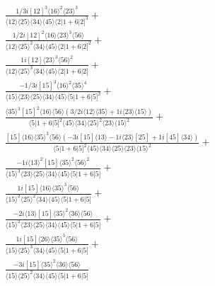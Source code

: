 \documentclass[varwidth, border=5pt]{standalone}
\begin{document}
\begin{my}
$\begin{gathered}
\scriptscriptstyle\frac{1/3i[12]^3⟨16⟩^2⟨23⟩^3}{⟨12⟩⟨25⟩⟨34⟩⟨45⟩⟨2|1+6|2]^3}+\\
\scriptscriptstyle\frac{1/2i[12]^2⟨16⟩⟨23⟩^3⟨56⟩}{⟨12⟩⟨25⟩^2⟨34⟩⟨45⟩⟨2|1+6|2]^2}+\\
\scriptscriptstyle\frac{1i[12]⟨23⟩^3⟨56⟩^2}{⟨12⟩⟨25⟩^3⟨34⟩⟨45⟩⟨2|1+6|2]}+\\
\scriptscriptstyle\frac{-1/3i[15]^3⟨16⟩^2⟨35⟩^4}{⟨15⟩⟨23⟩⟨25⟩⟨34⟩⟨45⟩⟨5|1+6|5]^3}+\\
\scriptscriptstyle\frac{⟨35⟩^3[15]^2⟨16⟩⟨56⟩(3/2i⟨12⟩⟨35⟩+1i⟨23⟩⟨15⟩)}{⟨5|1+6|5]^2⟨45⟩⟨34⟩⟨25⟩^2⟨23⟩⟨15⟩^2}+\\
\scriptscriptstyle\frac{[15]⟨16⟩⟨35⟩^3⟨56⟩(-3i[15]⟨13⟩-1i⟨23⟩[25]+1i[45]⟨34⟩)}{⟨5|1+6|5]^2⟨45⟩⟨34⟩⟨25⟩⟨23⟩⟨15⟩^2}+\\
\scriptscriptstyle\frac{-1i⟨13⟩^2[15]⟨35⟩^2⟨56⟩^2}{⟨15⟩^3⟨23⟩⟨25⟩⟨34⟩⟨45⟩⟨5|1+6|5]}+\\
\scriptscriptstyle\frac{1i[15]⟨16⟩⟨35⟩^3⟨56⟩}{⟨15⟩^2⟨25⟩^2⟨34⟩⟨45⟩⟨5|1+6|5]}+\\
\scriptscriptstyle\frac{-2i⟨13⟩[15]⟨35⟩^2⟨36⟩⟨56⟩}{⟨15⟩^2⟨23⟩⟨25⟩⟨34⟩⟨45⟩⟨5|1+6|5]}+\\
\scriptscriptstyle\frac{1i[15]⟨26⟩⟨35⟩^3⟨56⟩}{⟨15⟩⟨25⟩^3⟨34⟩⟨45⟩⟨5|1+6|5]}+\\
\scriptscriptstyle\frac{-3i[15]⟨35⟩^2⟨36⟩⟨56⟩}{⟨15⟩⟨25⟩^2⟨34⟩⟨45⟩⟨5|1+6|5]}\phantom{+}
\end{gathered}$
\end{my}
\end{document}
